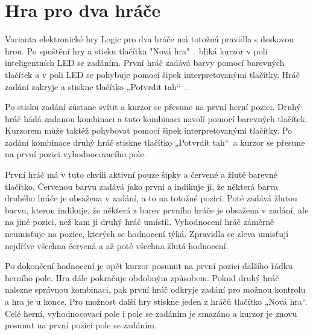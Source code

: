 \section{Hra pro dva hráče}
Varianta elektronické hry Logic pro dva hráče má totožná pravidla s deskovou hrou. Po spuštění hry a stisku tlačítka "Nová hra"\ .
bliká kurzor v poli inteligentních LED se zadáním. První hráč zadává barvy pomocí barevných tlačítek a v poli LED se pohybuje pomocí šipek 
interpretovanými tlačítky. Hráč zadání zakryje a stiskne tlačítko „Potvrdit tah“\ . 

Po stisku zadání zůstane svítit a kurzor se přesune na první herní pozici. Druhý hráč hádá zadanou kombinaci a tuto kombinaci 
navolí pomocí barevných tlačítek. Kurzorem může taktéž pohybovat pomocí šipek interpretovanými tlačítky. Po zadání kombinace 
druhý hráč stiskne tlačítko „Potvrdit tah“\  a kurzor se přesune na první pozici vyhodnocovacího pole. 

První hráč má v tuto chvíli aktivní pouze šipky a červené a žluté barevné tlačítko. Červenou barvu zadává jako první a 
indikuje jí, že některá barva druhého hráče je obsažena v zadání, a to na totožné pozici. Poté zadává žlutou barvu, kterou 
indikuje, že některá z barev prvního hráče je obsažena v zadání, ale na jiné pozici, než kam ji druhý hráč umístil. Vyhodnocení 
hráč záměrně neumisťuje na pozice, kterých se hodnocení týká. Zpravidla se zleva umisťují nejdříve všechna červená a až poté 
všechna žlutá hodnocení. 

Po dokončení hodnocení je opět kurzor posunut na první pozici dalšího řádku herního pole. Hra dále pokračuje obdobným způsobem.
Pokud druhý hráč nalezne správnou kombinaci, pak první hráč odkryje zadání pro možnou kontrolu a hra je u konce. Pro možnost další 
hry stiskne jeden z hráčů tlačítko „Nová hra“. Celé herní, vyhodnocovací pole i pole se zadáním je smazáno a kurzor je znovu posunut 
na první pozici pole se zadáním. 

